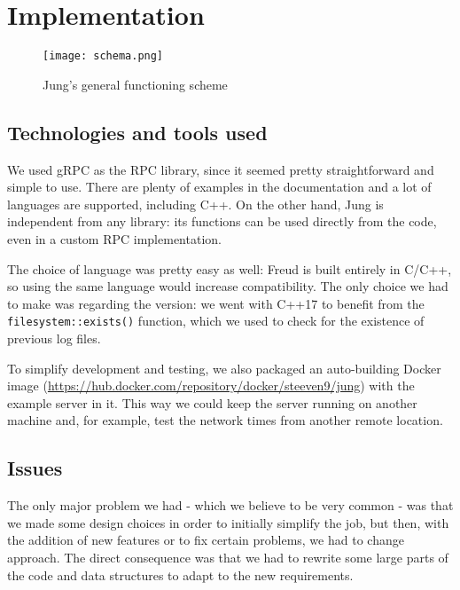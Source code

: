 \documentclass[11pt,english,singlespacing,headsepline,consistentlayout]{auxiliary/si-msc-thesis}
\begin{document}
\chapter{Implementation}

    \begin{figure}[H] \centering
\texttt{[image: schema.png]}
        \caption{Jung's general functioning scheme}
        \label{fig:schema}
    \end{figure}
    

    \section{Technologies and tools used}

        We used gRPC \cite{gRPCdocs} as the RPC library, since it
seemed pretty straightforward and simple to use. There are plenty of
examples in the documentation and a lot of languages are supported,
including C++. On the other hand, Jung is independent from any
library: its functions can be used directly from the code, even in a
custom RPC implementation.

        The choice of language was pretty easy as well: Freud is built
entirely in C/C++, so using the same language would increase
compatibility. The only choice we had to make was regarding the
version: we went with C++17 to benefit from the
\texttt{filesystem::exists()} function, which we used to check for the
existence of previous log files.

        To simplify development and testing, we also packaged an
auto-building Docker image
(\url{https://hub.docker.com/repository/docker/steeven9/jung}) with
the example server in it.  This way we could keep the server running
on another machine and, for example, test the network times from
another remote location.


    \section{Issues}\label{sec:issues}

        The only major problem we had - which we believe to be very
common - was that we made some design choices in order to initially
simplify the job, but then, with the addition of new features or to
fix certain problems, we had to change approach. The direct
consequence was that we had to rewrite some large parts of the code
and data structures to adapt to the new requirements.
        
\end{document}

